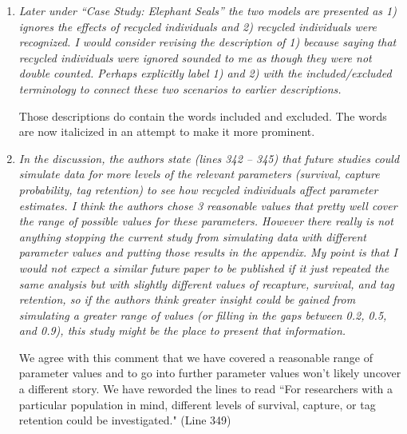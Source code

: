 \documentclass[12pt]{article}
\begin{document}
\begin{enumerate}
\item {\it Later under “Case Study: Elephant Seals” the two models are presented as 1) ignores the effects of recycled individuals and 2) recycled individuals were recognized. I would consider revising the description of 1) because saying that recycled individuals were ignored sounded to me as though they were not double counted. Perhaps explicitly label 1) and 2) with the included/excluded terminology to connect these two scenarios to earlier descriptions.}

Those descriptions do contain the words included and excluded. The words are now italicized in an attempt to make it more prominent. 

\item {\it In the discussion, the authors state (lines 342 – 345) that future studies could simulate data for more levels of the relevant parameters (survival, capture probability, tag retention) to see how recycled individuals affect parameter estimates. I think the authors chose 3 reasonable values that pretty well cover the range of possible values for these parameters. However there really is not anything stopping the current study from simulating data with different parameter values and putting those results in the appendix. My point is that I would not expect a similar future paper to be published if it just repeated the same analysis but with slightly different values of  recapture, survival, and tag retention, so if the authors think greater insight could be gained from simulating a greater range of values (or filling in the gaps between 0.2, 0.5, and 0.9), this study might be the place to present that information. }

We agree with this comment that we have covered a reasonable range of parameter values and to go into further parameter values won't likely uncover a different story.  We have reworded the lines  to read 
``For researchers with a particular population in mind, different levels of survival, capture, or tag retention could be investigated." (Line 349)


\end{enumerate}
\end{document}
